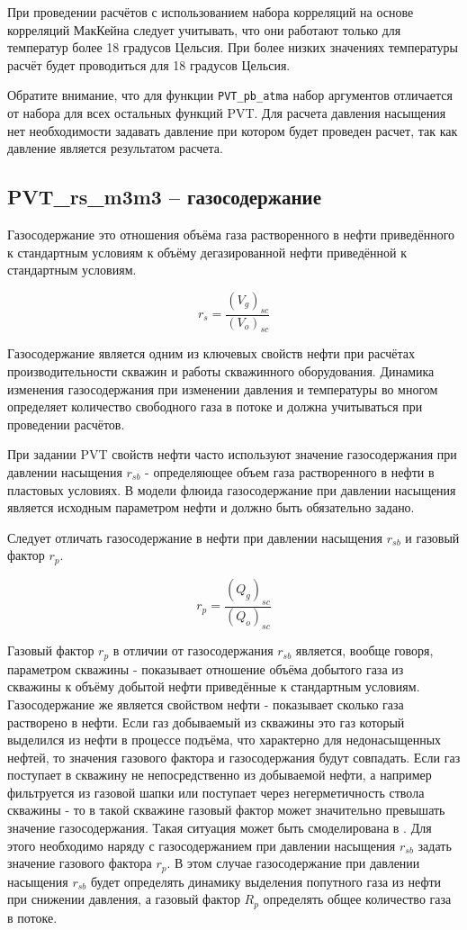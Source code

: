 При проведении расчётов с использованием набора корреляций на основе корреляций МакКейна следует учитывать, что они работают только для температур более 18 градусов Цельсия. При более низких значениях температуры расчёт будет проводиться для 18 градусов Цельсия. 

Обратите внимание, что для функции \texttt{PVT_pb_atma} набор аргументов отличается от набора для всех остальных функций PVT. Для расчета давления насыщения нет необходимости задавать давление при котором будет проведен расчет, так как давление является результатом расчета.

\subsection{PVT\_rs\_m3m3 – газосодержание}

Газосодержание это отношения объёма газа растворенного в нефти приведённого к стандартным условиям к объёму дегазированной нефти приведённой к стандартным условиям. 

$$r_s = \frac{(V_g)_{sc}}{(V_o)_{sc}}$$

Газосодержание является одним из ключевых свойств нефти при расчётах производительности скважин и работы скважинного оборудования. Динамика изменения газосодержания при изменении давления и температуры во многом определяет количество свободного газа в потоке и должна учитываться при проведении расчётов. 

При задании PVT свойств нефти часто используют значение газосодержания при давлении насыщения $r_{sb}$ - определяющее объем газа растворенного в нефти в пластовых условиях. В модели флюида \unf{} газосодержание при давлении насыщения является исходным параметром нефти и должно быть обязательно задано. 

Следует отличать газосодержание в нефти при давлении насыщения $r_{sb}$ и газовый фактор $r_p$.

$$r_p = \frac{(Q_g)_{sc}}{(Q_o)_{sc}}$$

Газовый фактор $r_{p}$  в отличии от газосодержания $r_{sb}$  является, вообще говоря, параметром скважины - показывает отношение объёма добытого газа из скважины к объёму добытой нефти приведённые к стандартным условиям. Газосодержание же является свойством нефти - показывает сколько газа растворено в нефти. Если газ добываемый из скважины это газ который выделился из нефти в процессе подъёма, что характерно для недонасыщенных нефтей, то значения газового фактора и газосодержания будут совпадать. Если газ поступает в скважину не непосредственно из добываемой нефти, а например фильтруется из газовой шапки или поступает через негерметичность ствола скважины - то в такой скважине газовый фактор может значительно превышать значение газосодержания. Такая ситуация может быть смоделирована в \unf{}. Для этого необходимо наряду с газосодержанием при давлении насыщения $r_{sb}$ задать значение газового фактора $r_p$. В этом случае газосодержание при давлении насыщения $r_{sb}$  будет определять динамику выделения попутного газа из нефти при снижении давления, а газовый фактор $R_p$ определять общее количество газа в потоке. 

